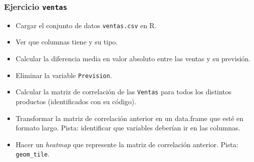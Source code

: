 \documentclass{beamer}
\begin{document}
\begin{frame}
\frametitle{Ejercicio \texttt{ventas}}

\begin{itemize}
\item Cargar el conjunto de datos \texttt{ventas.csv} en R.
\item Ver que columnas tiene y su tipo.
\item Calcular la diferencia media en valor absoluto entre las ventas y su previsión.
\item Eliminar la variable \texttt{Prevision}.
\item Calcular la matriz de correlación de las \texttt{Ventas} para todos los distintos productos (identificados con su código).
\item Transformar la matriz de correlación anterior en un data.frame que esté en formato largo. Pista: identificar que variables deberían ir en las columnas.
\item Hacer un \textit{heatmap} que represente la matriz de correlación anterior. Pista: \texttt{geom\_tile}.
\end{itemize}
\end{frame}
\end{document}
